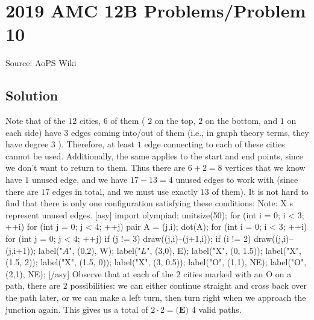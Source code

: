 \documentclass[12pt]{article}
\begin{document}
\section*{{2019 AMC 12B Problems/Problem 10}}
Source: AoPS Wiki

\subsection*{Solution}
Note that of the $12$ cities, $6$ of them ( $2$ on the top, $2$ on the bottom, and $1$ on each side) have $3$ edges coming into/out of them (i.e., in graph theory terms, they have degree $3$ ). Therefore, at least $1$ edge connecting to each of these cities cannot be used. Additionally, the same applies to the start and end points, since we don't want to return to them. Thus there are $6+2=8$ vertices that we know have $1$ unused edge, and we have $17-13=4$ unused edges to work with (since there are $17$ edges in total, and we must use exactly $13$ of them). It is not hard to find that there is only one configuration satisfying these conditions: Note: $\text{X}$ s represent unused edges. [asy] import olympiad; unitsize(50); for (int i = 0; i < 3; ++i) { for (int j = 0; j < 4; ++j) { pair A = (j,i); dot(A); } } for (int i = 0; i < 3; ++i) { for (int j = 0; j < 4; ++j) { if (j != 3) { draw((j,i)--(j+1,i)); } if (i != 2) { draw((j,i)--(j,i+1)); } } } label("$A$", (0,2), W); label("$L$", (3,0), E); label("X", (0, 1.5)); label("X", (1.5, 2)); label("X", (1.5, 0)); label("X", (3, 0.5)); label("O", (1,1), NE); label("O", (2,1), NE); [/asy] Observe that at each of the $2$ cities marked with an $\text{O}$ on a path, there are $2$ possibilities: we can either continue straight and cross back over the path later, or we can make a left turn, then turn right when we approach the junction again. This gives us a total of $2\cdot 2 = \boxed{\textbf{(E) } 4}$ valid paths.
\end{document}
